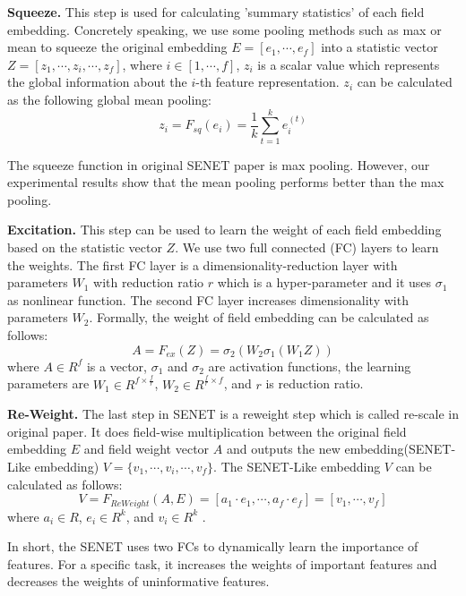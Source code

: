 \documentclass[sigconf]{acmart}
\begin{document}
\noindent\textbf{Squeeze.} This step is used for calculating 'summary statistics'
of each field embedding. Concretely speaking, we use some pooling
methods such as max or mean to squeeze the original embedding
\(E=[e_1,\cdots, e_f]\) into a statistic vector
\(Z  = [z_1,\cdots,z_i, \cdots,  z_f]\), where
\(i \in [1,\cdots,f]\), \(z_i\) is a scalar value which represents the
global information about the \(i\)-th feature representation. \(z_i\)
can be calculated as the following global mean pooling:
\begin{equation}
    z_i = F_{sq}(e_i)=\frac {1}{k}{\sum_{t=1}^{k}e_{i}^{(t)}}
\end{equation}

The squeeze function in original SENET paper\cite{hu2017squeeze} is max pooling. However,
our experimental results show that the mean pooling performs better than
the max pooling. 

\noindent\textbf{Excitation.} This step can be used to learn the weight of each
field embedding based on the statistic vector \(Z\). We use two full
connected (FC) layers to learn the weights. The first FC layer is a
dimensionality-reduction layer with parameters \(W_1\) with reduction
ratio \(r\) which is a hyper-parameter and it uses \(\sigma_1\) as
nonlinear function. The second FC layer increases dimensionality with
parameters \(W_2\). Formally, the weight of field embedding can be
calculated as follows:
\begin{equation}
    A = F_{ex}(Z)=\sigma_2(W_2\sigma_1(W_1Z))
\end{equation}
where \(A \in R^{f}\) is a vector, \( \sigma_1\) and \(\sigma_2\) are
activation functions, the learning parameters are
\( W_1 \in R^{f \times \frac{f}{r}}\),
\(W_2\in R^{\frac{f}{r} \times f}\), and \(r\) is reduction ratio.

\noindent\textbf{Re-Weight.} The last step in SENET is a reweight step which is
called re-scale in original paper\cite{hu2017squeeze}. It does field-wise multiplication
between the original field embedding \(E\) and field weight vector \(A\) and
outputs the new embedding(SENET-Like embedding)
\( V=\{v_1,\cdots,v_i,\cdots,v_f\}\). The SENET-Like embedding \(V\)
can be calculated as follows:
\begin{equation}
V= F_{ReWeight}(A, E)=[a_1\cdot e_1, \cdots, a_f \cdot e_f]=[v_1, \cdots, v_f]
\end{equation}
where \(a_i \in R\), \(e_i \in R^k\), and \(v_i \in R^k\) .

In short, the SENET uses two FCs to dynamically learn the importance of features.
For a specific task, it increases the weights of important
features and decreases the weights of uninformative features.
\end{document}
